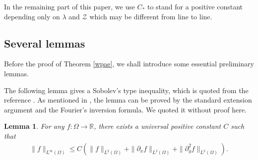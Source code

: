 \documentclass{amsart}
\numberwithin{equation}{section}
\newtheorem{lemma}{Lemma}[section]
\begin{document}
In the remaining part of this paper, we use $C_{*}$ to stand for a positive constant depending only on $\lambda$ and $\mathcal{Z}$ which may be different from line to line.
~~~~~~~~~~

\subsection{Several lemmas}

Before the proof of Theorem \ref{wpae}, we shall introduce some essential preliminary lemmas.

The following lemma gives a Sobolev's type inequality, which is quoted from the reference \cite{MW}. As mentioned in \cite{MW}, the lemma can be proved by the standard extension argument and the Fourier's inversion formula. We quoted it without proof here.
\begin{lemma}\label{Linfty}
For any $f: \Omega\to\mathbb{R}$, there exists a universal positive constant $C$ such that
\begin{align*}
\|f\|_{L^{\infty}(\Omega)}\leq C\left(\|f\|_{L^{2}(\Omega)}+\|\partial_{x}f\|_{L^{2}(\Omega)}+\|\partial_{y}^{2}f\|_{L^{2}(\Omega)}\right).
\end{align*}
\end{lemma}
\end{document}
